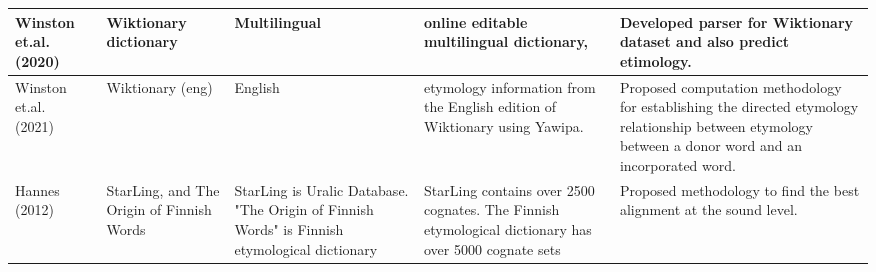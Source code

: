 \begin{table}[htbp]
\begin{tabular}{|p{2cm}|p{2cm}|p{2cm}|p{4cm}|p{4cm}|}
        Winston et.al. (2020)~\cite{wu_computational_2020}   & Wiktionary dictionary                                                                                             & Multilingual                                                                                  & online editable multilingual dictionary,                                                                                                                                             & Developed parser for Wiktionary dataset and also predict etimology.                                                                   \\ \hline

        Winston et.al. (2021)~\cite{wu_2021_sequence}\cite{} & Wiktionary (eng)                                                                                                  & English                                                                                       & etymology information from the English
        edition of Wiktionary using Yawipa.                  & Proposed computation methodology for establishing the directed etymology relationship between etymology between a
        donor word and an incorporated word.                                                                                                                                                                                                                                                                                                                                                                                                                                                                                                                                                                    \\ \hline

        Hannes (2012)~\cite{wettig_using_2012}               & StarLing, and The Origin of Finnish Words                                                                         & StarLing is Uralic Database. "The Origin of Finnish Words" is Finnish etymological dictionary & StarLing contains over 2500 cognates. The Finnish etymological dictionary has over 5000 cognate sets                                                                                 & Proposed methodology to find the best alignment at the sound level.                                                                   \\ \hline


\end{tabular}
\end{table}
